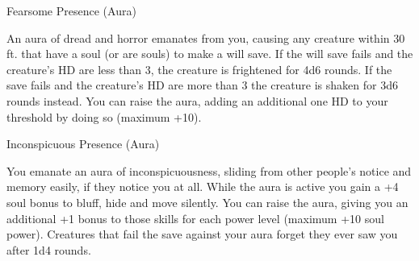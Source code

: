 \begin{soulpower}{Fearsome Presence (Aura)}
  \components{-}

  An aura of dread and horror emanates from you, causing any creature within
  30 ft. that have a soul (or are souls) to make a will save. If the will save
  fails and the creature's HD are less than 3, the creature is frightened for
  4d6 rounds. If the save fails and the creature's HD are more than 3 the
  creature is shaken for 3d6 rounds instead. You can raise the aura, adding an
  additional one HD to your threshold by doing so (maximum +10).
\end{soulpower}

\begin{soulpower}{Inconspicuous Presence (Aura)}

  \components{-}
  \rangepersonal

  You emanate an aura of inconspicuousness, sliding from other people's notice
  and memory easily, if they notice you at all. While the aura is active you
  gain a +4 soul bonus to bluff, hide and move silently. You can raise the
  aura, giving you an additional +1 bonus to those skills for each power level
  (maximum +10 soul power). Creatures that fail the save against your aura
  forget they ever saw you after 1d4 rounds.
\end{soulpower}
